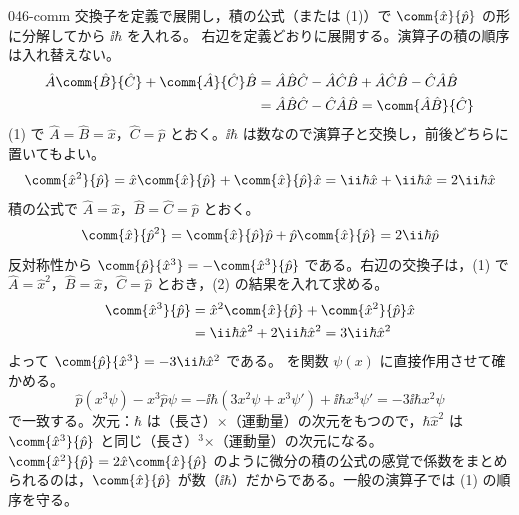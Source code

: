 \documentclass[uplatex,dvipdfmx,a4paper,11pt]{jsarticle}
\begin{document}
\begin{kaisetsu}{046-comm}
\houshin 交換子を定義で展開し，積の公式（または (1)）で $\comm{\hat{x}}{\hat{p}}$ の形に分解してから $\ii\hbar$ を入れる。
\keisan {} 右辺を定義どおりに展開する。演算子の積の順序は入れ替えない。
\begin{align*}
\hat{A}\comm{\hat{B}}{\hat{C}}+\comm{\hat{A}}{\hat{C}}\hat{B}
&=\hat{A}\hat{B}\hat{C}-\hat{A}\hat{C}\hat{B}+\hat{A}\hat{C}\hat{B}-\hat{C}\hat{A}\hat{B}\\
&=\hat{A}\hat{B}\hat{C}-\hat{C}\hat{A}\hat{B}=\comm{\hat{A}\hat{B}}{\hat{C}}
\end{align*}
 (1) で $\hat{A}=\hat{B}=\hat{x}$，$\hat{C}=\hat{p}$ とおく。$\ii\hbar$ は数なので演算子と交換し，前後どちらに置いてもよい。
\[ \comm{\hat{x}^{2}}{\hat{p}}=\hat{x}\comm{\hat{x}}{\hat{p}}+\comm{\hat{x}}{\hat{p}}\hat{x}=\ii\hbar\hat{x}+\ii\hbar\hat{x}=2\ii\hbar\hat{x} \]
 積の公式で $\hat{A}=\hat{x}$，$\hat{B}=\hat{C}=\hat{p}$ とおく。
\[ \comm{\hat{x}}{\hat{p}^{2}}=\comm{\hat{x}}{\hat{p}}\hat{p}+\hat{p}\comm{\hat{x}}{\hat{p}}=2\ii\hbar\hat{p} \]
 反対称性から $\comm{\hat{p}}{\hat{x}^{3}}=-\comm{\hat{x}^{3}}{\hat{p}}$ である。右辺の交換子は，(1) で $\hat{A}=\hat{x}^{2}$，$\hat{B}=\hat{x}$，$\hat{C}=\hat{p}$ とおき，(2) の結果を入れて求める。
\begin{align*}
\comm{\hat{x}^{3}}{\hat{p}}&=\hat{x}^{2}\comm{\hat{x}}{\hat{p}}+\comm{\hat{x}^{2}}{\hat{p}}\hat{x}\\
&=\ii\hbar\hat{x}^{2}+2\ii\hbar\hat{x}^{2}=3\ii\hbar\hat{x}^{2}
\end{align*}
よって $\comm{\hat{p}}{\hat{x}^{3}}=-3\ii\hbar\hat{x}^{2}$ である。
\kenzan {} を関数 $\psi(x)$ に直接作用させて確かめる。
\[ \hat{p}(x^{3}\psi)-x^{3}\hat{p}\psi=-\ii\hbar\left(3x^{2}\psi+x^{3}\psi'\right)+\ii\hbar x^{3}\psi'=-3\ii\hbar x^{2}\psi \]
で一致する。次元：$\hbar$ は（長さ）×（運動量）の次元をもつので，$\hbar\hat{x}^{2}$ は $\comm{\hat{x}^{3}}{\hat{p}}$ と同じ（長さ）$^{3}$×（運動量）の次元になる。
\tsumazuki $\comm{\hat{x}^{2}}{\hat{p}}=2\hat{x}\comm{\hat{x}}{\hat{p}}$ のように微分の積の公式の感覚で係数をまとめられるのは，$\comm{\hat{x}}{\hat{p}}$ が数（$\ii\hbar$）だからである。一般の演算子では (1) の順序を守る。
\end{kaisetsu}
\end{document}
